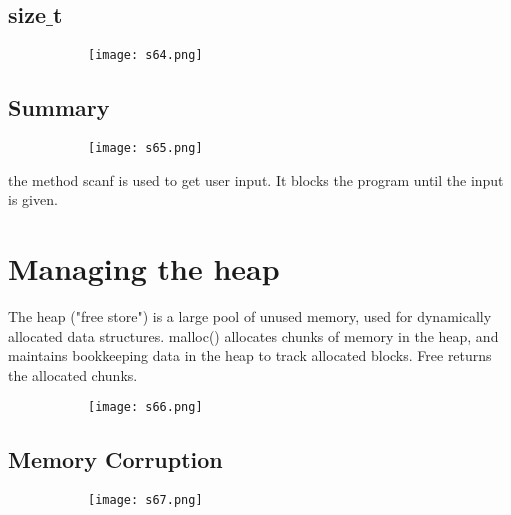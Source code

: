 \documentclass[8pt]{extreport}
\begin{document}
\subsection{size$\_$t}
\begin{figure}[H]
\centering
\begin{subfigure}[b]{0.4\linewidth}
\texttt{[image: s64.png]}
\end{subfigure}
\end{figure}

\subsection{Summary}
\begin{figure}[H]
\centering
\begin{subfigure}[b]{0.4\linewidth}
\texttt{[image: s65.png]}
\end{subfigure}
\end{figure}
the method scanf is used to get user input. It blocks the program until the input is given.

\section{Managing the heap}

The heap ("free store") is a large pool of unused memory, used for dynamically allocated data structures. malloc() allocates chunks of memory in the heap, and maintains bookkeeping data in the heap to track allocated blocks. Free returns the allocated chunks.
\begin{figure}[H]
\centering
\begin{subfigure}[b]{0.4\linewidth}
\texttt{[image: s66.png]}
\end{subfigure}
\end{figure}

\subsection{Memory Corruption}
\begin{figure}[H]
\centering
\begin{subfigure}[b]{0.4\linewidth}
\texttt{[image: s67.png]}
\end{subfigure}
\end{figure}
\end{document}
